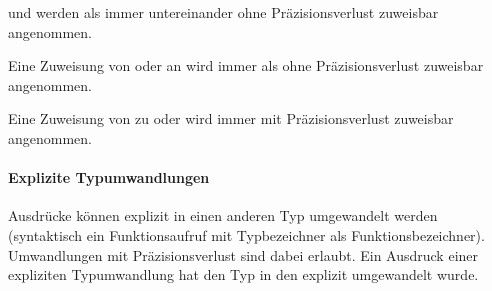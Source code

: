  und  werden als immer untereinander ohne Präzisionsverlust zuweisbar
angenommen.

Eine Zuweisung von  oder  an  wird immer als ohne Präzisionsverlust zuweisbar
angenommen.

Eine Zuweisung von  zu  oder  wird immer mit Präzisionsverlust zuweisbar angenommen.

\paragraph{{Explizite Typumwandlungen}}\label{__Explizite Typumwandlungen__}
Ausdrücke können explizit in einen anderen Typ umgewandelt werden (syntaktisch ein Funktionsaufruf mit
Typbezeichner als Funktionsbezeichner). Umwandlungen mit Präzisionsverlust sind dabei erlaubt.
Ein Ausdruck einer expliziten Typumwandlung hat den Typ in den explizit umgewandelt wurde.


